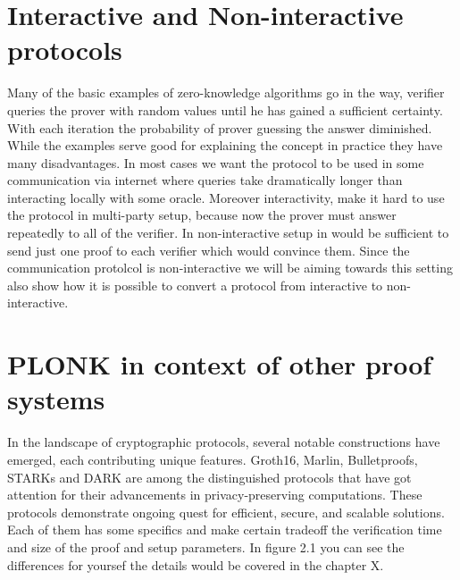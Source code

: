 \section{Interactive and Non-interactive protocols}
Many of the basic examples of zero-knowledge algorithms go in the way, verifier queries the prover with random values until he has gained a sufficient certainty. With each iteration the probability of prover guessing the answer diminished. While the examples serve good for explaining the concept in practice they have many disadvantages. In most cases we want the protocol to be used in some communication via internet where queries take dramatically longer than interacting locally with some oracle. Moreover interactivity, make it hard to use the protocol in multi-party setup, because now the prover must answer repeatedly to all of the verifier. In non-interactive setup in would be sufficient to send just one proof to each verifier which would convince them. Since the communication protolcol is non-interactive we will be aiming towards this setting also show how it is possible to convert a protocol from interactive to non-interactive. 

\section{PLONK in context of other proof systems}
In the landscape of cryptographic protocols, several notable constructions have emerged, each contributing unique features. Groth16, Marlin, Bulletproofs, STARKs and DARK are among the distinguished protocols that have got attention for their advancements in privacy-preserving computations. These protocols demonstrate ongoing quest for efficient, secure, and scalable solutions. Each of them has some specifics and make certain tradeoff the verification time and size of the proof and setup parameters. In figure 2.1 you can see the differences for yoursef the details would be covered in the chapter X.
